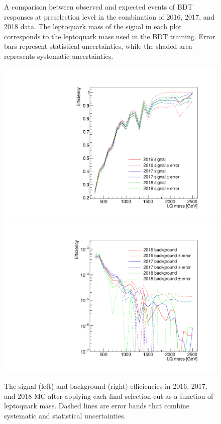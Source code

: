 \begin{figure}[H]
    \caption{A comparison between observed and expected events of BDT responses at preselection level in the combination of 2016, 2017, and 2018 data. The leptoquark mass of the signal in each plot corresponds to the leptoquark mass used in the BDT training. Error bars represent statistical uncertainties, while the shaded area represents systematic uncertainties.
    \label{figapp:BDT2700to4000}}
\end{figure}

\begin{figure}[H]
    \centering
    {\includegraphics[width=.49\textwidth]{Images/Analysis/finalSelectionEfficiencies_TGraphAsymmErrors_Signal.pdf}}
    {\includegraphics[width=.49\textwidth]{Images/Analysis/finalSelectionEfficiencies_TGraphAsymmErrors_Background.pdf}}
    \caption{The signal (left) and background (right) efficiencies in 2016, 2017, and 2018 MC after applying each final selection cut as a function of leptoquark mass. Dashed lines are error bands that combine systematic and statistical uncertainties.
    \label{figapp:efficiency}}
\end{figure}

